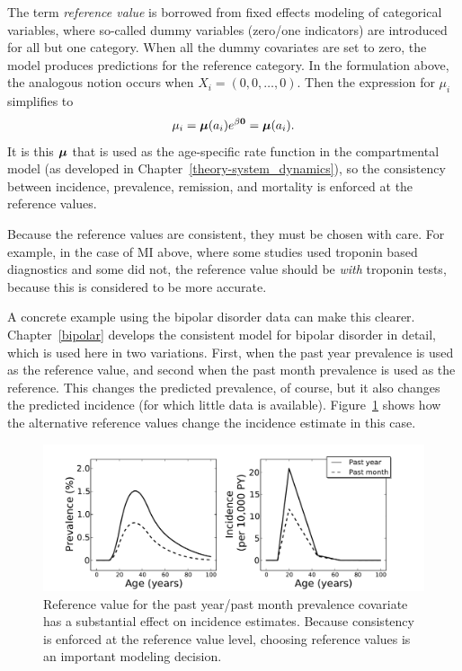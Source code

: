 The term \emph{reference value} is borrowed from fixed effects
modeling of categorical variables, where so-called dummy variables
(zero/one indicators) are introduced for all but one category. When
all the dummy covariates are set to zero, the model produces
predictions for the reference category. In the formulation above, the
analogous notion occurs when $X_i = (0, 0, \ldots, 0)$.  Then the
expression for $\mu_i$ simplifies to
\[
\mu_i = \boldsymbol{\mu}(a_i) e^{\beta \mathbf{0}} = \boldsymbol{\mu}(a_i).
\]
It is this $\boldsymbol{\mu}$ that is used as the age-specific rate function in
the compartmental model (as developed in
Chapter~\ref{theory-system_dynamics}), so the consistency between
incidence, prevalence, remission, and mortality is enforced at the
reference values.

Because the reference values are consistent, they must be chosen with
care.  For example, in the case of MI above, where some studies used
troponin based diagnostics and some did not, the reference value
should be \emph{with} troponin tests, because this is considered to be
more accurate.

A concrete example using the bipolar disorder data can make this
clearer.  Chapter~\ref{bipolar} develops the consistent model for
bipolar disorder in detail, which is used here in two variations.
First, when the past year prevalence is used as the reference
value, and second when the past month prevalence is used as the
reference.  This changes the predicted prevalence, of course, but it
also changes the predicted incidence (for which little data is
available).  Figure~\ref{bipolar-ref-alts} shows how the alternative
reference values change the incidence estimate in this case.


\begin{figure}[h]
\begin{center}
\includegraphics[width=\textwidth]{bipolar-ref-alts.pdf}
\caption{Reference value for the past year/past month prevalence
  covariate has a substantial effect on incidence estimates.  Because
  consistency is enforced at the reference value level, choosing reference
  values is an important modeling decision.}
\label{bipolar-ref-alts}
\end{center}
\end{figure}


